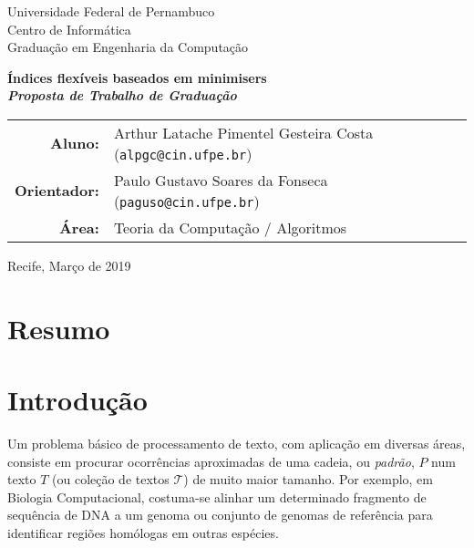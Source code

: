 \documentclass[12pt, a4paper, oneside]{article}
\begin{document}


\thispagestyle{empty}
\begin{center}
\Large
Universidade Federal de Pernambuco\\
Centro de Informática\\
Graduação em Engenharia da Computação

\vfill

{\huge \bfseries Índices flexíveis baseados em minimisers }
\\
\medskip
{\bfseries\itshape Proposta de Trabalho de Graduação}

\vfill

\bigskip

	\begin{tabular}{r p{100mm}}
	\textbf{Aluno: } & Arthur Latache Pimentel Gesteira Costa \newline(\texttt{alpgc@cin.ufpe.br}) \\ 
\textbf{Orientador: } & Paulo Gustavo Soares da Fonseca \newline(\texttt{paguso@cin.ufpe.br})
\\
	\textbf{Área: } & Teoria da Computação / Algoritmos
\end{tabular}

	\vspace{3cm}
Recife, Março de 2019
\end{center}

\clearpage 
\thispagestyle{empty}
\section{Resumo}



\clearpage
\setcounter{page}{1}
\section{Introdução}

Um problema básico de processamento de texto, com aplicação em diversas áreas, consiste em procurar ocorrências aproximadas de uma cadeia, ou \emph{padrão}, $P$ num texto $T$ (ou coleção de textos $\mathcal{T}$) de muito maior tamanho. Por exemplo, em Biologia Computacional, costuma-se alinhar um determinado fragmento de sequência de DNA a um genoma ou conjunto de genomas de referência para identificar regiões homólogas em outras espécies. 
\end{document}
